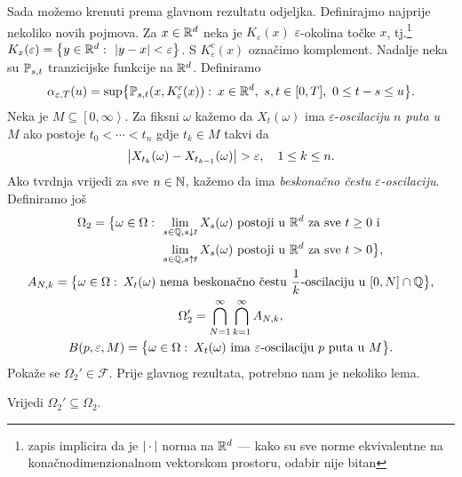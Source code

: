 \documentclass[main.tex]{subfiles}
\begin{document}
\nocite{*}

\bigskip
Sada možemo krenuti prema glavnom rezultatu odjeljka. Definirajmo najprije nekoliko novih pojmova.
Za \( x \in \mathbb{R}^d \) neka je \( K_\varepsilon(x) \) \( \varepsilon \)-okolina točke \( x \), tj.\footnote{zapis implicira da je  \( \left| {\, \cdot \,} \right| \) norma na \( \mathbb{R}^d \) --- kako su
	sve norme ekvivalentne na konačnodimenzionalnom vektorskom prostoru, odabir nije bitan}\
\( K_x(\varepsilon) = \left\{ y \in \mathbb{R}^d \, \colon \, \left| {y-x} \right| < \varepsilon \right\} \). S \( K_\varepsilon^c(x) \) označimo komplement.
Nadalje neka su \( \mathbb{P}_{s,t} \) tranzicijske funkcije na \( \mathbb{R}^d \). Definiramo
\begin{equation}\label{eq:defalpha}
	\alpha_{\varepsilon, T}(u) = \sup \bigl\{ \mathbb{P}_{s,t}(x, K_\varepsilon^c(x)) \, \colon \, x \in \mathbb{R}^d, \ s, t \in [0, T], \ 0 \le t-s \le u \bigr\}.
\end{equation}
Neka je \( M \subseteq \left[ 0, \infty\right\rangle \). Za fiksni \( \omega \) kažemo da
\( X_t(\omega)  \) ima \( \varepsilon \)-\emph{oscilaciju} \( n \) \emph{puta u} \( M \) ako postoje
\( t_0 < \cdots < t_n \) gdje \( t_k \in M \) takvi da
\[
	\left| {X_{t_k}(\omega)-X_{t_{k-1}}(\omega)} \right| > \varepsilon, \quad 1 \le k \le n.
\]
Ako tvrdnja vrijedi za sve \( n \in \mathbb{N} \), kažemo da ima \emph{beskonačno čestu} \( \varepsilon \)\emph{-oscilaciju}. Definiramo još
\begin{gather}
	\begin{aligned}
		\Omega_2 = \bigl\{ \omega \in \Omega \st & \lim_{s \in \Q, s \downarrow t} X_s(\omega) \mathrm{\ postoji \ u \ } \R^d \mathrm{\ za \ sve \ } t \ge 0 \mathrm{ \ i \ } \\                                & \lim_{s \in \Q, s \uparrow t} X_s(\omega) \mathrm{\ postoji \ u \ } \R^d \mathrm{\ za \ sve \ } t > 0	\bigr\},
	\end{aligned}
	\\
	A_{N, k} = \bigl\{ \omega \in \Omega \st X_t(\omega) \mathrm{\ nema \ beskona\check cno \ \check cestu \ } \frac 1k \mathrm{\text{-oscilaciju}\ u \ } [0, N] \cap \Q \bigr\},
	\\
	\Omega_2' = \bigcap_{N=1}^\infty \bigcap_{k=1}^\infty A_{N, k},
	\\
	B(p, \varepsilon, M) = \bigl\{  \omega \in \Omega \st X_t(\omega) \mathrm{\ ima \ } \varepsilon \mathrm{\text{-oscilaciju}\ } p \mathrm{\ puta \ u \ } M  \bigr\}.
\end{gather}
Pokaže se \( \Omega_2' \in \mathcal F \). Prije glavnog rezultata, potrebno nam je nekoliko lema.
\begin{lema}
	Vrijedi \( \Omega_2' \subseteq \Omega_2 \).
\end{lema}
\end{document}

